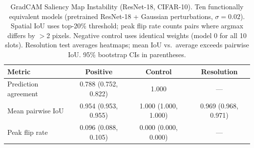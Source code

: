 \begin{table}[ht]
\centering
\caption{GradCAM Saliency Map Instability (ResNet-18, CIFAR-10).
  Ten functionally equivalent models (pretrained ResNet-18 + Gaussian perturbations, $\sigma=0.02$).
  Spatial IoU uses top-20\% threshold; peak flip rate counts pairs where argmax differs by $>$2 pixels.
  Negative control uses identical weights (model 0 for all 10 slots).
  Resolution test averages heatmaps; mean IoU vs.\ average exceeds pairwise IoU.
  95\% bootstrap CIs in parentheses.}
\label{tab:gradcam}
\begin{tabular}{lccc}
\toprule
Metric & Positive & Control & Resolution \\
\midrule
Prediction agreement & 0.788 (0.752, 0.822) & 1.000 & --- \\
Mean pairwise IoU & 0.954 (0.953, 0.955) & 1.000 (1.000, 1.000) & 0.969 (0.968, 0.971) \\
Peak flip rate & 0.096 (0.088, 0.105) & 0.000 (0.000, 0.000) & --- \\
\bottomrule
\end{tabular}
\end{table}
